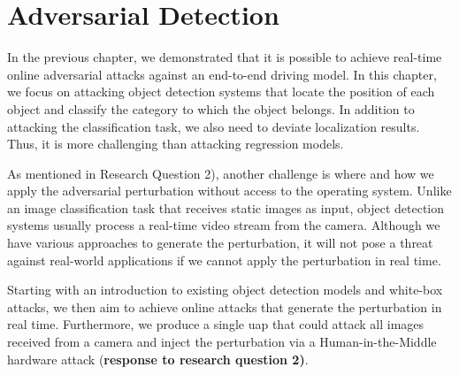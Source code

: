 \chapter{Adversarial Detection}
\label{chpt:detection}


In the previous chapter, we demonstrated that it is possible to achieve real-time online adversarial attacks against an end-to-end driving model. In this chapter, we focus on attacking object detection systems that locate the position of each object and classify the category to which the object belongs. In addition to attacking the classification task, we also need to deviate localization results. Thus, it is more challenging than attacking regression models.

As mentioned in Research Question 2), another challenge is where and how we apply the adversarial perturbation without access to the operating system. Unlike an image classification task that receives static images as input, object detection systems usually process a real-time video stream from the camera. Although we have various approaches to generate the perturbation, it will not pose a threat against real-world applications if we cannot apply the perturbation in real time.

Starting with an introduction to existing object detection models and white-box attacks, we then aim to achieve online attacks that generate the perturbation in real time. Furthermore, we produce a single \acrfull{uap} that could attack all images received from a camera and inject the perturbation via a Human-in-the-Middle hardware attack (\textbf{response to research question 2)}.




